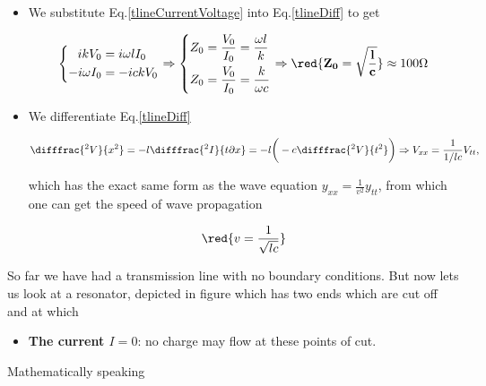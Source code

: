  \begin{itemize}
 	\item We substitute Eq.\eqref{tlineCurrentVoltage} into Eq.\eqref{tlineDiff} to get
 	
 	\begin{equation}
 		\left\lbrace \begin{aligned}
 			ikV_0&=i\omega lI_0\\
 			-i\omega I_0 & = -ickV_0
 		\end{aligned}\right. \Rightarrow\left\lbrace \begin{aligned}
 		Z_0&=\frac{V_0}{I_0} = \frac{\omega l }{k}\\
 		Z_0&=\frac{V_0}{I_0} = \frac{k}{\omega c}\\
 		\end{aligned}\right. \Rightarrow \red{\mathbf{Z_0 = \sqrt{\frac{l}{c}}}}\approx 100\Omega
 	\end{equation}
 	
 	\item We differentiate Eq.\eqref{tlineDiff}
 	
 	\begin{equation}
	 	\difffrac{^2V}{x^2} = -l\difffrac{^2I}{t\partial x} = -l\bigg(-c\difffrac{^2V}{t^2}\bigg) \Rightarrow V_{xx} = \frac{1}{1/lc}V_{tt},
 	\end{equation}
 	
 	\noindent which has the exact same form as the wave equation $ y_{xx}=\frac{1}{v^2}y_{tt} $, from which one can get the speed of wave propagation
 	
 	\begin{equation}
	 	\red{v=\frac{1}{\sqrt{lc}}}
 	\end{equation}
 \end{itemize}
 
 \begin{figure}
 	\caption{\label{tlineres1}}
 \end{figure}
 
 So far we have had a transmission line with no boundary conditions. But now lets us look at a resonator, depicted in figure which has two ends which are cut off and at which
 
 \begin{itemize}
 	\item \textbf{The current $ I=0 $}: no charge may flow at these points of cut.
 \end{itemize}

 Mathematically speaking
 
